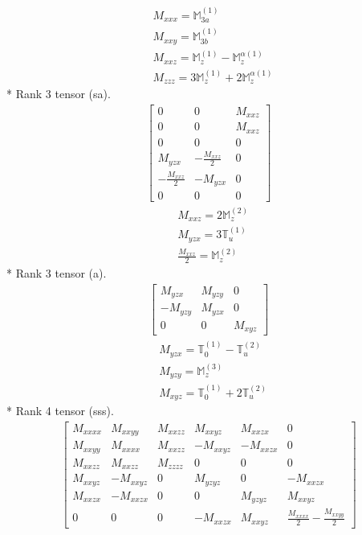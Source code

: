 \documentclass[fleqn,8pt,landscape]{jsarticle}
\begin{document}
\begin{align*}
& M_{xxx} = \mathbb{M}_{3a}^{(1)} \\
& M_{xxy} = \mathbb{M}_{3b}^{(1)} \\
& M_{xxz} = \mathbb{M}_{z}^{(1)} - \mathbb{M}_{z}^{\alpha(1)} \\
& M_{zzz} = 3 \mathbb{M}_{z}^{(1)} + 2 \mathbb{M}_{z}^{\alpha(1)}
\end{align*}
* Rank 3 tensor (sa).
\begin{align*}
\begin{bmatrix} 0 & 0 & M_{xxz} \\ 0 & 0 & M_{xxz} \\ 0 & 0 & 0 \\ M_{yzx} & - \frac{M_{xxz}}{2} & 0 \\ - \frac{M_{xxz}}{2} & - M_{yzx} & 0 \\ 0 & 0 & 0 \end{bmatrix}
\end{align*}
\begin{align*}
& M_{xxz} = 2 \mathbb{M}_{z}^{(2)} \\
& M_{yzx} = 3 \mathbb{T}_{u}^{(1)} \\
& \frac{M_{xxz}}{2} = \mathbb{M}_{z}^{(2)}
\end{align*}
* Rank 3 tensor (a).
\begin{align*}
\begin{bmatrix} M_{yzx} & M_{yzy} & 0 \\ - M_{yzy} & M_{yzx} & 0 \\ 0 & 0 & M_{xyz} \end{bmatrix}
\end{align*}
\begin{align*}
& M_{yzx} = \mathbb{T}_{0}^{(1)} - \mathbb{T}_{u}^{(2)} \\
& M_{yzy} = \mathbb{M}_{z}^{(3)} \\
& M_{xyz} = \mathbb{T}_{0}^{(1)} + 2 \mathbb{T}_{u}^{(2)}
\end{align*}
* Rank 4 tensor (sss).
\begin{align*}
\begin{bmatrix} M_{xxxx} & M_{xxyy} & M_{xxzz} & M_{xxyz} & M_{xxzx} & 0 \\ M_{xxyy} & M_{xxxx} & M_{xxzz} & - M_{xxyz} & - M_{xxzx} & 0 \\ M_{xxzz} & M_{xxzz} & M_{zzzz} & 0 & 0 & 0 \\ M_{xxyz} & - M_{xxyz} & 0 & M_{yzyz} & 0 & - M_{xxzx} \\ M_{xxzx} & - M_{xxzx} & 0 & 0 & M_{yzyz} & M_{xxyz} \\ 0 & 0 & 0 & - M_{xxzx} & M_{xxyz} & \frac{M_{xxxx}}{2} - \frac{M_{xxyy}}{2} \end{bmatrix}
\end{align*}
\end{document}
